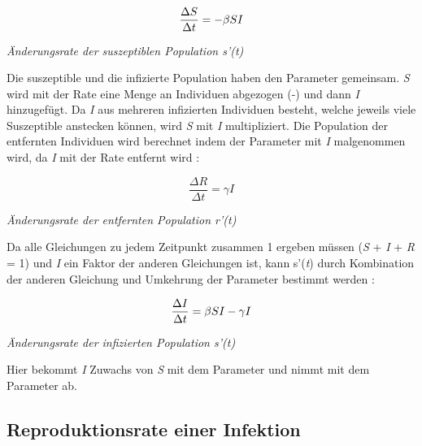 \documentclass[12pt]{scrartcl} %
\begin{document}
$$ \frac{\Delta S}{\Delta t} = -\beta\space S I $$
\begin{center}
\textsl{Änderungsrate der suszeptiblen Population s'(\textit{t})}
\end{center}

Die suszeptible und die infizierte Population haben den Parameter \textbeta \space gemeinsam. \textit{S} wird mit der Rate \textbeta \space eine Menge an Individuen abgezogen (-\textbeta) und dann \textit{I} hinzugefügt. Da \textit{I} aus mehreren infizierten Individuen besteht, welche jeweils \textbeta\space viele Suszeptible anstecken können, wird \textbeta\textit{S} mit \textit{I} multipliziert.
Die Population der entfernten Individuen wird berechnet indem der Parameter \textgamma\space mit \textit{I} malgenommen wird, da \textit{I} mit der Rate \textgamma\space entfernt wird \cite{7,3}:

$$ \frac{\Delta R}{\Delta t} = \gamma I $$
\begin{center}
\textsl{Änderungsrate der entfernten Population r'(\textit{t})}
\end{center}


Da alle Gleichungen zu jedem Zeitpunkt zusammen 1 ergeben müssen (\textit{S} + \textit{I} + \textit{R} = 1) und \textit{I} ein Faktor der anderen Gleichungen ist, kann s'(\textit{t}) durch Kombination der anderen Gleichung und Umkehrung der Parameter bestimmt werden
 \cite{3, 4}:

$$ \frac{\Delta I}{\Delta t} = \beta\space S I - \gamma I $$
\begin{center}
\textsl{Änderungsrate der infizierten Population s'(\textit{t})}
\end{center}

Hier bekommt \textit{I} Zuwachs von \textit{S} mit dem Parameter \textbeta\space und nimmt mit dem Parameter \textgamma\space ab.


\subsection{Reproduktionsrate einer Infektion}
\end{document}
